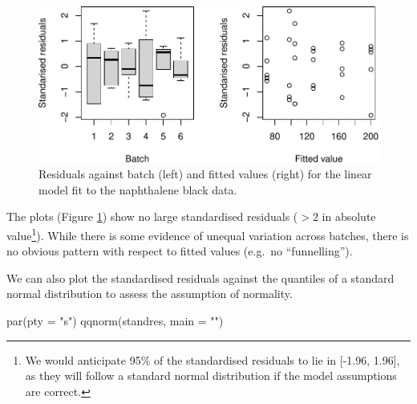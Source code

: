\documentclass[
]{book}
\newenvironment{Shaded}{\begin{snugshade}}{\end{snugshade}}
\newcommand{\AttributeTok}[1]{\textcolor[rgb]{0.77,0.63,0.00}{#1}}
\newcommand{\FunctionTok}[1]{\textcolor[rgb]{0.00,0.00,0.00}{#1}}
\newcommand{\NormalTok}[1]{#1}
\newcommand{\StringTok}[1]{\textcolor[rgb]{0.31,0.60,0.02}{#1}}
\theoremstyle{definition}
\theoremstyle{definition}
\theoremstyle{definition}
\theoremstyle{definition}
\theoremstyle{remark}
\begin{document}
\begin{enumerate}
  \begin{figure}

   {\centering \includegraphics[width=1\linewidth]{bookdown_math3014-6027_files/figure-latex/residuals-1} 

   }

   \caption{Residuals against batch (left) and fitted values (right) for the linear model fit to the naphthalene black data.}\label{fig:residuals}
   \end{figure}

  The plots (Figure \ref{fig:residuals}) show no large standardised residuals (\(>2\) in absolute value\footnote{We would anticipate 95\% of the standardised residuals to lie in {[}-1.96, 1.96{]}, as they will follow a standard normal distribution if the model assumptions are correct.}). While there is some evidence of unequal variation across batches, there is no obvious pattern with respect to fitted values (e.g.~no ``funnelling'').

  We can also plot the standardised residuals against the quantiles of a standard normal distribution to assess the assumption of normality.

\begin{Shaded}
\begin{Highlighting}[]
\FunctionTok{par}\NormalTok{(}\AttributeTok{pty =} \StringTok{"s"}\NormalTok{)}
\FunctionTok{qqnorm}\NormalTok{(standres, }\AttributeTok{main =} \StringTok{""}\NormalTok{)}
\end{Highlighting}
\end{Shaded}

  \begin{figure}


\end{figure}
\end{enumerate}
\end{document}
